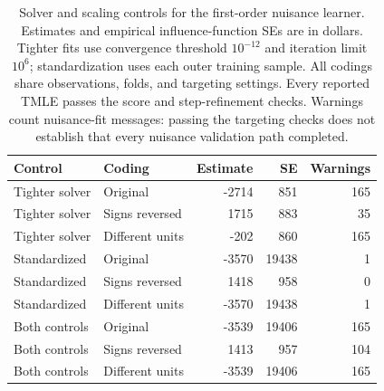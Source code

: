 \begin{table}[ht]
\centering
\small
\caption{Solver and scaling controls for the first-order nuisance
learner. Estimates and empirical influence-function SEs are in dollars.
Tighter fits use convergence threshold $10^{-12}$ and iteration limit
$10^6$; standardization uses each outer training sample. All codings
share observations, folds, and targeting settings. Every reported
TMLE passes the score and step-refinement checks. Warnings count
nuisance-fit messages: passing the targeting checks does not establish
that every nuisance validation path completed.}
\label{tab:causal-controls}

\begin{tabular}{llrrr}
\toprule
Control & Coding & Estimate & SE & Warnings\\
\midrule
Tighter solver & Original & -2714 & 851 & 165\\
Tighter solver & Signs reversed & 1715 & 883 & 35\\
Tighter solver & Different units & -202 & 860 & 165\\
\addlinespace
Standardized & Original & -3570 & 19438 & 1\\
Standardized & Signs reversed & 1418 & 958 & 0\\
Standardized & Different units & -3570 & 19438 & 1\\
\addlinespace
Both controls & Original & -3539 & 19406 & 165\\
Both controls & Signs reversed & 1413 & 957 & 104\\
Both controls & Different units & -3539 & 19406 & 165\\
\bottomrule
\end{tabular}
\end{table}
